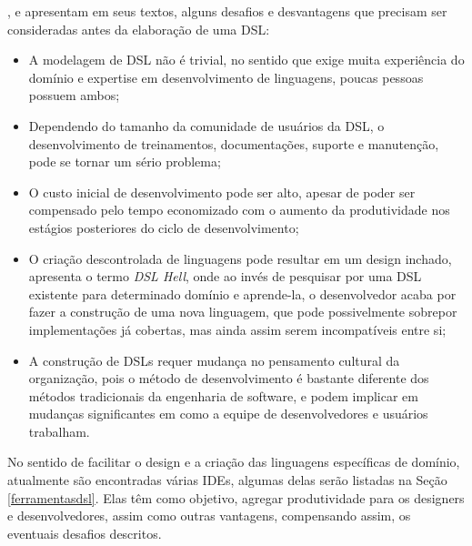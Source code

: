 ,  e  apresentam em seus textos, alguns desafios e desvantagens que precisam ser consideradas antes da elaboração de uma \gls{DSL}:

\begin{itemize}
    \item A modelagem de \gls{DSL} não é trivial, no sentido que exige muita experiência do domínio e expertise em desenvolvimento de linguagens, poucas pessoas possuem ambos;
    \item Dependendo do tamanho da comunidade de usuários da \gls{DSL}, o desenvolvimento de treinamentos, documentações, suporte e manutenção, pode se tornar um sério problema;
    \item O custo inicial de desenvolvimento pode ser alto, apesar de poder ser compensado pelo tempo economizado com o aumento da produtividade nos estágios posteriores do ciclo de desenvolvimento;
    \item O criação descontrolada de linguagens pode resultar em um design inchado,  apresenta o termo \textit{DSL Hell}, onde ao invés de pesquisar por uma \gls{DSL} existente para determinado domínio e aprende-la, o desenvolvedor acaba por fazer a construção de uma nova linguagem, que pode possivelmente sobrepor implementações já cobertas, mas ainda assim serem incompatíveis entre si;
    \item A construção de \gls{DSL}s requer mudança no pensamento cultural da organização, pois o método de desenvolvimento é bastante diferente dos métodos tradicionais da engenharia de software, e podem implicar em mudanças significantes em como a equipe de desenvolvedores e usuários trabalham.
    
\end{itemize}

No sentido de facilitar o design e a criação das linguagens específicas de domínio, atualmente são encontradas várias \gls{IDE}s, algumas delas serão listadas na Seção \ref{ferramentasdsl}. Elas têm como objetivo, agregar produtividade para os designers e desenvolvedores, assim como outras vantagens, compensando assim, os eventuais desafios descritos.



